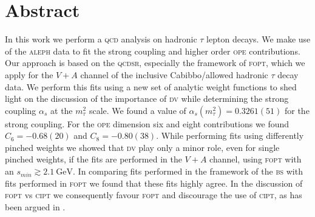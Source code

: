 \documentclass[../../index.tex]{subfiles}
\begin{document}
\chapter*{Abstract}
In this work we perform a \textsc{qcd} analysis on hadronic \(\tau\) lepton
decays. We make use of the \textsc{aleph} data to fit the strong coupling and
higher order \textsc{ope} contributions. Our approach is based on the
\textsc{qcdsr}, especially the framework of \textsc{fopt}, which we apply for
the \(V+A\) channel of the inclusive Cabibbo\-/allowed hadronic \(\tau\) decay
data. We perform this fits using a new set of analytic weight functions to shed
light on the discussion of the importance of \textsc{dv} while determining the
strong coupling \(\alpha_s\) at the \(m_\tau^2\) scale. We found a value of
\(\alpha_s(m_\tau^2) = 0.3261(51) \) for the strong coupling. For the
\textsc{ope} dimension six and eight contributions we found \(C_6 = -0.68(20)\)
and \(C_8 = -0.80(38) \). While performing fits using differently pinched
weights we showed that \textsc{dv} play only a minor role, even for single
pinched weights, if the fits are performed in the \(V+A\) channel, using
\textsc{fopt} with an \(s_{min} \gtrsim \SI{2.1}{\giga\eV}\). In comparing fits
performed in the framework of the \textsc{bs} with fits performed in
\textsc{fopt} we found that these fits highly agree. In the discussion of
\textsc{fopt} vs \textsc{cipt} we consequently favour \textsc{fopt} and
discourage the use of \textsc{cipt}, as has been argued in \cite{Beneke2008}.
\end{document}
